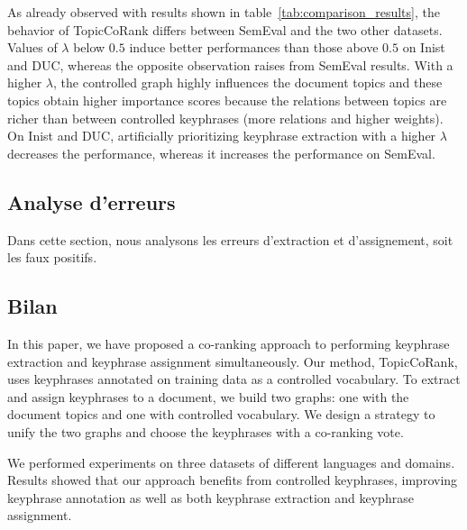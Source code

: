           As already observed with results shown in table~\ref{tab:comparison_results}, the
          behavior of TopicCoRank differs between SemEval and the two other datasets. Values
          of $\lambda$ below $0.5$ induce better performances than those above $0.5$ on Inist and
          DUC, whereas the opposite observation raises from SemEval results. With a higher
          $\lambda$, the controlled graph highly influences the document topics and these topics obtain
          higher importance scores because the relations between topics are richer than
          between controlled keyphrases (more relations and higher weights). On Inist and DUC,
          artificially prioritizing keyphrase extraction with a higher $\lambda$ decreases
          the performance, whereas it increases the performance on SemEval.

    \subsection{Analyse d'erreurs}
    \label{subsec:main-automatic_keyphrase_annotation-supervised_automatic_keyphrase_annotation-error_analysis}
      Dans cette section, nous analysons les erreurs d'extraction et
      d'assignement, soit les faux positifs. \TODO{\dots}

    \subsection{Bilan}
    \label{subsec:main-automatic_keyphrase_annotation-supervised_automatic_keyphrase_annotation-conclusion}
      In this paper, we have proposed a co-ranking approach to performing keyphrase
      extraction and keyphrase assignment simultaneously. Our method,
      TopicCoRank, uses keyphrases annotated on training data as a controlled
      vocabulary. %
      To extract and assign keyphrases to a document, we build two graphs: one with the
      document topics and one with controlled vocabulary. We design a strategy to unify the two graphs and 
      choose the keyphrases with  a co-ranking vote.
      
      
      We performed experiments on three datasets of different languages and
      domains. Results showed that our approach benefits from controlled
      keyphrases, improving keyphrase annotation as well as both keyphrase extraction and keyphrase assignment.

